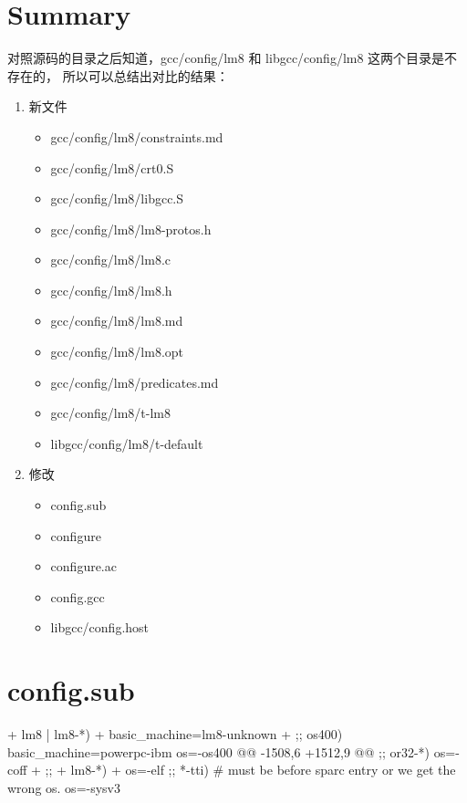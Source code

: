 \section{Summary}
对照源码的目录之后知道，gcc/config/lm8 和 libgcc/config/lm8 这两个目录是不存在的，
所以可以总结出对比的结果：
\begin{enumerate}
    \item 新文件
    \begin{itemize}
        \item gcc/config/lm8/constraints.md
        \item gcc/config/lm8/crt0.S
        \item gcc/config/lm8/libgcc.S
        \item gcc/config/lm8/lm8-protos.h
        \item gcc/config/lm8/lm8.c
        \item gcc/config/lm8/lm8.h
        \item gcc/config/lm8/lm8.md
        \item gcc/config/lm8/lm8.opt
        \item gcc/config/lm8/predicates.md
        \item gcc/config/lm8/t-lm8
        \item libgcc/config/lm8/t-default
    \end{itemize}

    \item 修改
    \begin{itemize}
        \item config.sub
        \item configure
        \item configure.ac
        \item config.gcc
        \item libgcc/config.host
    \end{itemize}
\end{enumerate}

\clearpage
\section{config.sub}

\begin{diffcode}
+	lm8 | lm8-*)
+		basic_machine=lm8-unknown
+		;;
 	os400)
 		basic_machine=powerpc-ibm
 		os=-os400
@@ -1508,6 +1512,9 @@
 		;;
 	or32-*)
 		os=-coff
+		;;
+	lm8-*)
+		os=-elf
 		;;
 	*-tti)	# must be before sparc entry or we get the wrong os.
 		os=-sysv3

\end{diffcode}

